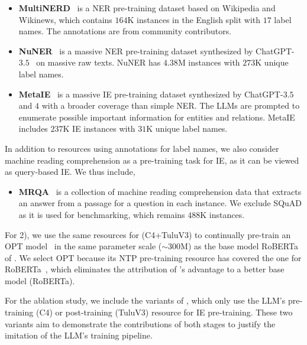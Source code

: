 \begin{itemize}[nosep,leftmargin=*]
    \item \textbf{MultiNERD}~\citep{multinerd} is a NER pre-training dataset based on Wikipedia and Wikinews, which contains $164$K instances in the English split with $17$ label names. The annotations are from community contributors.
    \item \textbf{NuNER}~\citep{NuNER} is a massive NER pre-training dataset synthesized by ChatGPT-$3.5$~\citep{chatgpt} on massive raw texts. NuNER has $4.38$M instances with $273$K unique label names.
    \item \textbf{MetaIE}~\citep{metaie} is a massive IE pre-training dataset synthesized by ChatGPT-$3.5$ and $4$ with a broader coverage than simple NER. The LLMs are prompted to enumerate possible important information for entities and relations. MetaIE includes $237$K IE instances with $31$K unique label names.
\end{itemize}

In addition to resources using annotations for label names, we also consider machine reading comprehension as a pre-training task for IE, as it can be viewed as query-based IE. We thus include,

\begin{itemize}[nosep,leftmargin=*]
    \item \textbf{MRQA}~\citep{MRQA} is a collection of machine reading comprehension data that extracts an answer from a passage for a question in each instance. We exclude SQuAD as it is used for benchmarking, which remains $488$K instances.
\end{itemize}

For 2), we use the same resources for \our (C4+TuluV3) to continually pre-train an OPT model~\citep{OPT} in the same parameter scale ($\sim300$M) as the base model RoBERTa of \our. We select OPT because its NTP pre-training resource has covered the one for RoBERTa~\citep{roberta,OPT}, which eliminates the attribution of \our's advantage to a better base model (RoBERTa).

For the ablation study, we include the variants of \our, which only use the LLM's pre-training (C4) or post-training (TuluV3) resource for IE pre-training. These two variants aim to demonstrate the contributions of both stages to justify the imitation of the LLM's training pipeline. 


